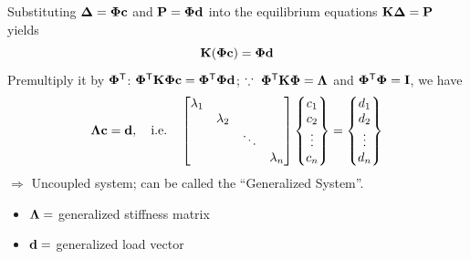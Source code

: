 Substituting $\bm{\Delta} = \bm{\Phi}\mathbf{c}$ and $\mathbf{P} = \bm{\Phi}\mathbf{d}$ into the equilibrium equations $\mathbf{K}\bm{\Delta} = \mathbf{P}$ yields
\begin{equation}
  \mathbf{K}(\bm{\Phi}\mathbf{c}) = \bm{\Phi}\mathbf{d}
\end{equation}
Premultiply it by $\bm{\Phi}^{\mathsf{T}}$: $\bm{\Phi}^{\mathsf{T}}\mathbf{K}\bm{\Phi}\mathbf{c} = \bm{\Phi}^{\mathsf{T}}\bm{\Phi}\mathbf{d}$; $\because\ \bm{\Phi}^{\mathsf{T}}\mathbf{K}\bm{\Phi} = \bm{\Lambda}$ and $\bm{\Phi}^{\mathsf{T}}\bm{\Phi} = \mathbf{I}$, we have
\begin{equation}
  \bm{\Lambda}\mathbf{c} = \mathbf{d},\quad\text{i.e.}\quad
  \begin{bmatrix}\lambda_1 & & & \\ & \lambda_2 & & \\ & & \ddots & \\ & & & \lambda_n\end{bmatrix}\begin{Bmatrix}c_1\\ c_2\\ \vdots\\ c_n\end{Bmatrix} = \begin{Bmatrix}d_1\\ d_2\\ \vdots\\ d_n\end{Bmatrix}
\end{equation}
$\Longrightarrow$ Uncoupled system; can be called the ``Generalized System''.
\begin{itemize}
  \item $\bm{\Lambda} =$ generalized stiffness matrix
  \item $\mathbf{d} =$ generalized load vector
\end{itemize}

